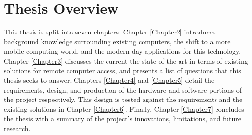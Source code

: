 \section{Thesis Overview}

This thesis is split into seven chapters.
Chapter \ref{Chapter2} introduces background knowledge surrounding existing computers, the shift to a more mobile computing world, and the modern day applications for this technology.
Chapter \ref{Chapter3} discusses the current the state of the art in terms of existing solutions for remote computer access, and presents a list of questions that this thesis seeks to answer.
Chapters \ref{Chapter4} and \ref{Chapter5} detail the requirements, design, and production of the hardware and software portions of the project respectively.
This design is tested against the requirements and the existing solutions in Chapter \ref{Chapter6}.
Finally, Chapter \ref{Chapter7} concludes the thesis with a summary of the project's innovations, limitations, and future research.
